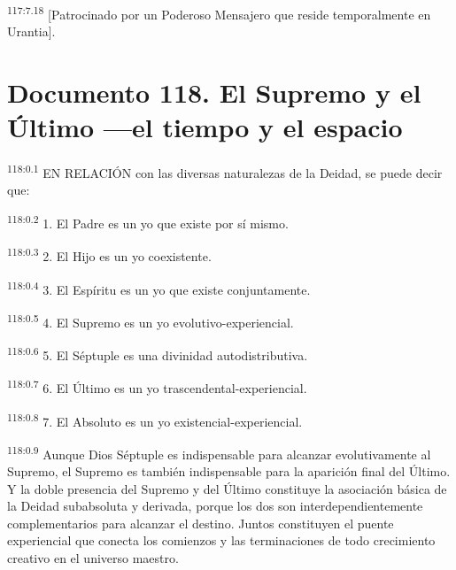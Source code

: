 \documentclass[twoside, 11pt]{book}
\begin{document}
\par
\textsuperscript{117:7.18} [Patrocinado por un Poderoso Mensajero que reside temporalmente en Urantia].


\chapter{Documento 118. El Supremo y el Último ---el tiempo y el espacio}
\par
\textsuperscript{118:0.1} EN RELACIÓN con las diversas naturalezas de la Deidad, se puede decir que:

\par
\textsuperscript{118:0.2} 1. El Padre es un yo que existe por sí mismo.

\par
\textsuperscript{118:0.3} 2. El Hijo es un yo coexistente.

\par
\textsuperscript{118:0.4} 3. El Espíritu es un yo que existe conjuntamente.

\par
\textsuperscript{118:0.5} 4. El Supremo es un yo evolutivo-experiencial.

\par
\textsuperscript{118:0.6} 5. El Séptuple es una divinidad autodistributiva.

\par
\textsuperscript{118:0.7} 6. El Último es un yo trascendental-experiencial.

\par
\textsuperscript{118:0.8} 7. El Absoluto es un yo existencial-experiencial.

\par
\textsuperscript{118:0.9} Aunque Dios Séptuple es indispensable para alcanzar evolutivamente al Supremo, el Supremo es también indispensable para la aparición final del Último. Y la doble presencia del Supremo y del Último constituye la asociación básica de la Deidad subabsoluta y derivada, porque los dos son interdependientemente complementarios para alcanzar el destino. Juntos constituyen el puente experiencial que conecta los comienzos y las terminaciones de todo crecimiento creativo en el universo maestro.
\end{document}
